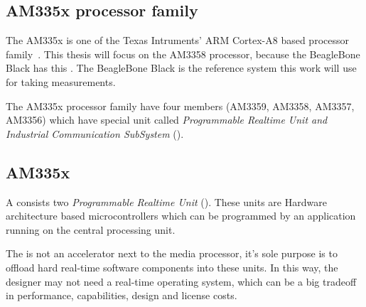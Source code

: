 \subsection{AM335x processor family}

The AM335x is one of the Texas Intruments' ARM Cortex-A8 based processor family~\citep{AM335x}. This thesis will focus on the AM3358 processor, because the BeagleBone Black \citep{BBB} has this \cpu. The BeagleBone Black is the reference system this work will use for taking measurements.

The AM335x processor family have four members (AM3359, AM3358, AM3357, AM3356) which have special unit called \emph{Programmable Realtime Unit and Industrial Communication SubSystem} (\pruss).

\subsection{AM335x \pruss}

A \pruss{} consists two \emph{Programmable Realtime Unit} (\pru). These units are Hardware architecture based microcontrollers which can be programmed by an application running on the central processing unit.

The \pru{} is not an accelerator next to the media processor, it's sole purpose is to offload hard real-time software components into these units. In this way, the designer may not need a real-time operating system, which can be a big tradeoff in performance, capabilities, design and license costs.

